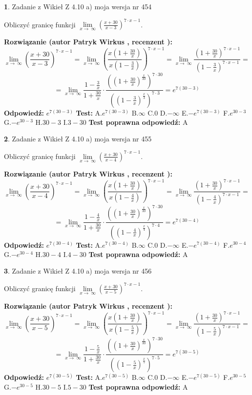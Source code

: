 \documentclass[12pt, a4paper]{article}
\theoremstyle{definition} %
\newtheorem{zad}{}
\newcommand{\zadStart}[1]{\begin{zad}#1\newline}
\newcommand{\zadStop}{\end{zad}}
\newcommand{\rozwStart}[2]{\noindent \textbf{Rozwiązanie (autor #1 , recenzent #2): }\newline}
\newcommand{\rozwStop}{\newline}
\newcommand{\odpStart}{\noindent \textbf{Odpowiedź:}\newline}
\newcommand{\odpStop}{\newline}
\newcommand{\testStart}{\noindent \textbf{Test:}\newline}
\newcommand{\testStop}{\newline}
\newcommand{\kluczStart}{\noindent \textbf{Test poprawna odpowiedź:}\newline}
\newcommand{\kluczStop}{\newline}
\begin{document}
\zadStart{Zadanie z Wikieł Z 4.10 a) moja wersja nr 454}


Obliczyć granicę funkcji  $\lim\limits_{x\to\ \infty}(\frac{x+30}{x-3})^{7\cdot x-1}$.
\zadStop
\rozwStart{Patryk Wirkus}{}
$$\lim\limits_{x\to\ \infty}(\frac{x+30}{x-3})^{7\cdot x-1} = \lim\limits_{x\to\ \infty}(\frac{x(1+\frac{30}{x})}{x(1-\frac{3}{x})})^{7\cdot x-1}=\lim\limits_{x\to\ \infty}\frac{(1+\frac{30}{x})^{7\cdot x-1}}{(1-\frac{3}{x})^{7\cdot x-1}}=$$
$$=\lim\limits_{x\to\ \infty}\frac{1-\frac{3}{x}}{1+\frac{30}{x}}\cdot\frac{((1+\frac{30}{x})^{\frac{x}{30}})^{7\cdot30}}{((1-\frac{3}{x})^{\frac{x}{3}})^{7\cdot3}}=e^{7(30-3)}$$
\rozwStop
\odpStart
$e^{7(30-3)}$
\odpStop
\testStart
A.$e^{7(30-3)}$ B.$\infty$ C.$0$ D.$-\infty$ E.$-e^{7(30-3)}$
F.$e^{30-3}$ G.$-e^{30-3}$
H.$30-3$
I.$3-30$
\testStop
\kluczStart
A
\kluczStop



\zadStart{Zadanie z Wikieł Z 4.10 a) moja wersja nr 455}


Obliczyć granicę funkcji  $\lim\limits_{x\to\ \infty}(\frac{x+30}{x-4})^{7\cdot x-1}$.
\zadStop
\rozwStart{Patryk Wirkus}{}
$$\lim\limits_{x\to\ \infty}(\frac{x+30}{x-4})^{7\cdot x-1} = \lim\limits_{x\to\ \infty}(\frac{x(1+\frac{30}{x})}{x(1-\frac{4}{x})})^{7\cdot x-1}=\lim\limits_{x\to\ \infty}\frac{(1+\frac{30}{x})^{7\cdot x-1}}{(1-\frac{4}{x})^{7\cdot x-1}}=$$
$$=\lim\limits_{x\to\ \infty}\frac{1-\frac{4}{x}}{1+\frac{30}{x}}\cdot\frac{((1+\frac{30}{x})^{\frac{x}{30}})^{7\cdot30}}{((1-\frac{4}{x})^{\frac{x}{4}})^{7\cdot4}}=e^{7(30-4)}$$
\rozwStop
\odpStart
$e^{7(30-4)}$
\odpStop
\testStart
A.$e^{7(30-4)}$ B.$\infty$ C.$0$ D.$-\infty$ E.$-e^{7(30-4)}$
F.$e^{30-4}$ G.$-e^{30-4}$
H.$30-4$
I.$4-30$
\testStop
\kluczStart
A
\kluczStop



\zadStart{Zadanie z Wikieł Z 4.10 a) moja wersja nr 456}


Obliczyć granicę funkcji  $\lim\limits_{x\to\ \infty}(\frac{x+30}{x-5})^{7\cdot x-1}$.
\zadStop
\rozwStart{Patryk Wirkus}{}
$$\lim\limits_{x\to\ \infty}(\frac{x+30}{x-5})^{7\cdot x-1} = \lim\limits_{x\to\ \infty}(\frac{x(1+\frac{30}{x})}{x(1-\frac{5}{x})})^{7\cdot x-1}=\lim\limits_{x\to\ \infty}\frac{(1+\frac{30}{x})^{7\cdot x-1}}{(1-\frac{5}{x})^{7\cdot x-1}}=$$
$$=\lim\limits_{x\to\ \infty}\frac{1-\frac{5}{x}}{1+\frac{30}{x}}\cdot\frac{((1+\frac{30}{x})^{\frac{x}{30}})^{7\cdot30}}{((1-\frac{5}{x})^{\frac{x}{5}})^{7\cdot5}}=e^{7(30-5)}$$
\rozwStop
\odpStart
$e^{7(30-5)}$
\odpStop
\testStart
A.$e^{7(30-5)}$ B.$\infty$ C.$0$ D.$-\infty$ E.$-e^{7(30-5)}$
F.$e^{30-5}$ G.$-e^{30-5}$
H.$30-5$
I.$5-30$
\testStop
\kluczStart
A
\kluczStop
\end{document}

